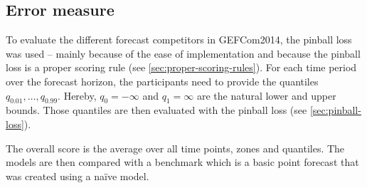 \subsection{Error measure}

To evaluate the different forecast competitors in GEFCom2014, 
the pinball loss was used -- mainly because of the ease of implementation 
and because the pinball loss is a proper scoring rule (see \ref{sec:proper-scoring-rules}).
For each time period over the forecast horizon, the participants need to 
provide the quantiles \(q_{0.01}, \ldots, q_{0.99}\). 
Hereby, \(q_0 = -\infty\) and \(q_1 = \infty\) are the natural lower and upper bounds. 
Those quantiles are then evaluated with the pinball loss (see \ref{sec:pinball-loss}).

The overall score is the average over all time points, zones and quantiles.
The models are then compared with a benchmark which is a basic point forecast 
that was created using a na\"{i}ve model.